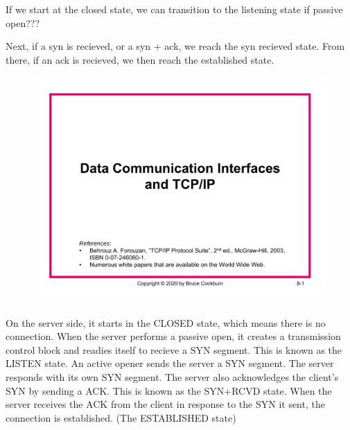 \section{}
If we start at the closed state, we can transition to the listening state if
passive open???

Next, if a syn is recieved, or a syn + ack, we reach the syn recieved state.
From there, if an ack is recieved, we then reach the established state. 

\begin{figure}[H]
  \centering
\includegraphics[page=40, width=\textwidth]{../../notes/Ch8_W20_TCP_IP.pdf}
\end{figure}

On the server side, it starts in the CLOSED state, which means there is no
connection. When the server performs a passive open, it creates a transmission
control block and readies itself to recieve a SYN segment. This is known as the
LISTEN state.
An active opener sends the server a SYN segment. The server responds
with its own SYN segment. The server also
acknowledges the client’s SYN by sending a ACK.
This is known as the SYN+RCVD state.
When the server
receives the ACK from the client in response to the SYN it sent, the
connection is established. (The ESTABLISHED state)

